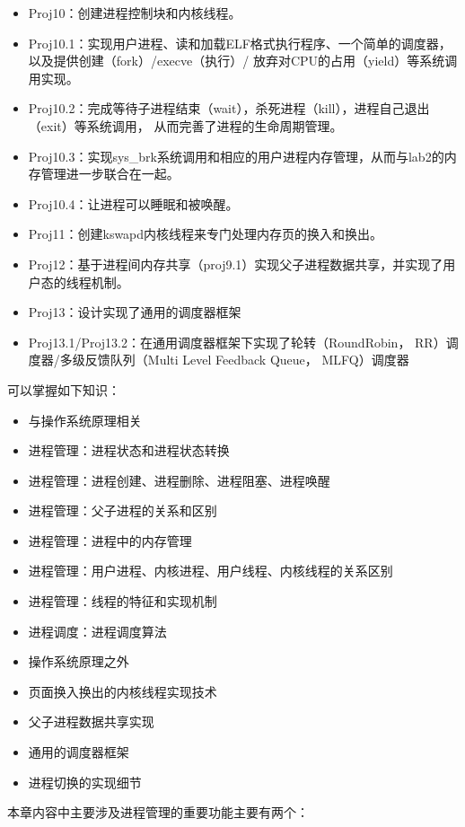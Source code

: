 \begin{itemize}
\item
  Proj10：创建进程控制块和内核线程。
\item
  Proj10.1：实现用户进程、读和加载ELF格式执行程序、一个简单的调度器，以及提供创建（fork）/execve（执行）/
  放弃对CPU的占用（yield）等系统调用实现。
\item
  Proj10.2：完成等待子进程结束（wait），杀死进程（kill），进程自己退出（exit）等系统调用，
  从而完善了进程的生命周期管理。
\item
  Proj10.3：实现sys\_brk系统调用和相应的用户进程内存管理，从而与lab2的内存管理进一步联合在一起。
\item
  Proj10.4：让进程可以睡眠和被唤醒。
\item
  Proj11：创建kswapd内核线程来专门处理内存页的换入和换出。
\item
  Proj12：基于进程间内存共享（proj9.1）实现父子进程数据共享，并实现了用户态的线程机制。
\item
  Proj13：设计实现了通用的调度器框架
\item
  Proj13.1/Proj13.2：在通用调度器框架下实现了轮转（RoundRobin，
  RR）调度器/多级反馈队列（Multi Level Feedback Queue， MLFQ）调度器
\end{itemize}

可以掌握如下知识：

\begin{itemize}
\item
  与操作系统原理相关
\item
  进程管理：进程状态和进程状态转换
\item
  进程管理：进程创建、进程删除、进程阻塞、进程唤醒
\item
  进程管理：父子进程的关系和区别
\item
  进程管理：进程中的内存管理
\item
  进程管理：用户进程、内核进程、用户线程、内核线程的关系区别
\item
  进程管理：线程的特征和实现机制
\item
  进程调度：进程调度算法
\item
  操作系统原理之外
\item
  页面换入换出的内核线程实现技术
\item
  父子进程数据共享实现
\item
  通用的调度器框架
\item
  进程切换的实现细节
\end{itemize}

本章内容中主要涉及进程管理的重要功能主要有两个：

